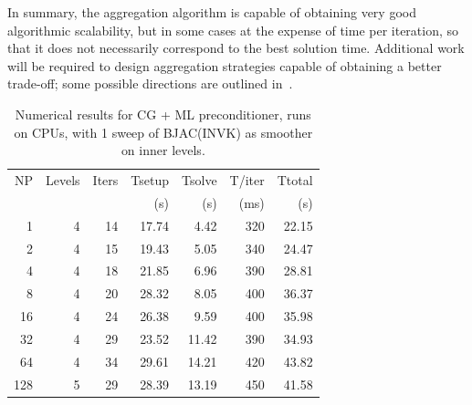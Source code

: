 In summary, the aggregation algorithm is capable of obtaining very
good algorithmic scalability, but in some cases at the expense of time
per iteration, so that it does not necessarily correspond to the best
solution time.
Additional work will be required to design aggregation
strategies capable of obtaining a better trade-off; some
possible directions are outlined in~\cite{bcm-toms}. 




\iffalse
\begin{table}[h!]
\centering
\caption{Numerical results for CG + ML preconditioner, runs on CPUs, with 1 sweep of BJAC(INVK) as smoother on inner levels.}
\label{cpu-invk}

\begin{tabular}{rrrrrrr}
NP  & Levels & Iters & Tsetup & Tsolve & T/iter & Ttotal \\
    &        &       & (s)    & (s)    & (ms)   & (s)    \\
\hline
1   & 4       & 14  & 17.74 & 4.42  & 320      & 22.15   \\
2   & 4       & 15  & 19.43 & 5.05  & 340      & 24.47   \\
4   & 4       & 18  & 21.85 & 6.96  & 390      & 28.81   \\
8   & 4       & 20  & 28.32 & 8.05  & 400      & 36.37   \\
16  & 4       & 24  & 26.38 & 9.59  & 400      & 35.98   \\
32  & 4       & 29  & 23.52 & 11.42 & 390      & 34.93   \\
64  & 4       & 34  & 29.61 & 14.21 & 420      & 43.82   \\
128 & 5       & 29  & 28.39 & 13.19 & 450      & 41.58    \\
\hline
\end{tabular}
\end{table}

